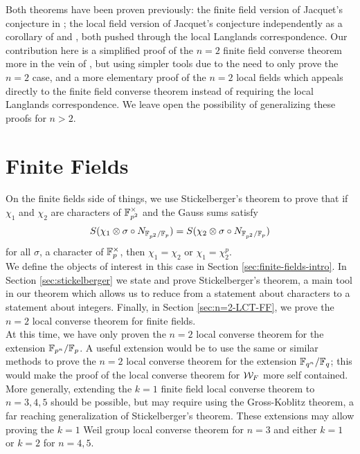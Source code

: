 Both theorems have been proven previously: the finite field version of Jacquet's conjecture in \cite{Nien2014}; the local field version of Jacquet's conjecture independently as a corollary of \cite{Jacquet2017} and \cite{Chai2016}, both pushed through the local Langlands correspondence.
Our contribution here is a simplified proof of the $n=2$ finite field converse theorem more in the vein of \cite{Nien2018}, but using simpler tools due to the need to only prove the $n=2$ case, and a more elementary proof of the $n=2$ local fields which appeals directly to the finite field converse theorem instead of requiring the local Langlands correspondence.
We leave open the possibility of generalizing these proofs for $n > 2$.
\\

\section{Finite Fields}
On the finite fields side of things, we use Stickelberger's theorem to prove that if $\chi_1$ and $\chi_2$ are characters of $\mathbb{F}_{p^2}^\times$ and the Gauss sums satisfy
\[S(\chi_1 \otimes \sigma \circ N_{\mathbb{F}_{p^2} / \mathbb{F}_p}) = S(\chi_2 \otimes \sigma \circ N_{\mathbb{F}_{p^2} / \mathbb{F}_p})\]
for all $\sigma$, a character of $\mathbb{F}_p^\times$, then $\chi_1 = \chi_2$ or $\chi_1 = \chi_2^p$.
\\

We define the objects of interest in this case in Section \ref{sec:finite-fields-intro}.
In Section \ref{sec:stickelberger} we state and prove Stickelberger's theorem, a main tool in our theorem which allows us to reduce from a statement about characters to a statement about integers.
Finally, in Section \ref{sec:n=2-LCT-FF}, we prove the $n=2$ local converse theorem for finite fields.
\\

At this time, we have only proven the $n=2$ local converse theorem for the extension $\mathbb{F}_{p^n}/\mathbb{F}_{p}$.
A useful extension would be to use the same or similar methods to prove the $n=2$ local converse theorem for the extension $\mathbb{F}_{q^n}/\mathbb{F}_q$; this would make the proof of the local converse theorem for $\mathcal{W}_F$ more self contained.
More generally, extending the $k = 1$ finite field local converse theorem to $n = 3,4,5$ should be possible, but may require using the Gross-Koblitz theorem, a far reaching generalization of Stickelberger's theorem.
These extensions may allow proving the $k = 1$ Weil group local converse theorem for $n = 3$ and either $k = 1$ or $k =2 $ for $n = 4,5$.
\\

